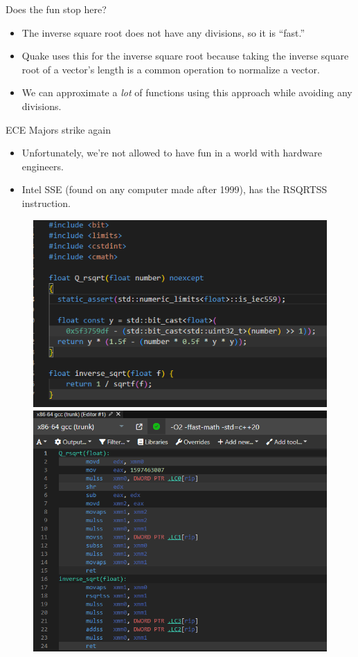 \documentclass[aspectratio=169]{beamer}
\begin{document}
\begin{frame}{Does the fun stop here?}
    \begin{itemize}
        \item The inverse square root does not have any divisions, so it is ``fast.'' \pause 
        \item Quake uses this for the inverse square root because taking the inverse square root of a vector's length is a common operation to normalize a vector. \pause 
        \item We can approximate a \textit{lot} of functions using this approach while avoiding any divisions. 
    \end{itemize}
\end{frame}

\begin{frame}{ECE Majors strike again}
    \begin{itemize}
        \item Unfortunately, we're not allowed to have fun in a world with hardware engineers. \pause 
        \item Intel SSE (found on any computer made after 1999), has the RSQRTSS instruction. \pause 
    \end{itemize}
    
    \begin{figure}
    \centering
    \includegraphics[width=0.49\linewidth]{image.png}
    \includegraphics[width=0.49\linewidth]{assembly.png}
\end{figure}
\end{frame}
\end{document}
